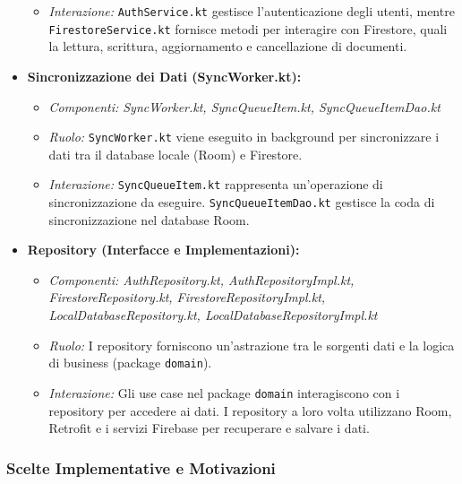 \documentclass{article}
\begin{document}
\begin{itemize}
\begin{itemize}
        \item \textit{Interazione:} \texttt{AuthService.kt} gestisce l'autenticazione degli utenti, mentre \texttt{FirestoreService.kt} fornisce metodi per interagire con Firestore, quali la lettura, scrittura, aggiornamento e cancellazione di documenti.
    \end{itemize}
    \item \textbf{Sincronizzazione dei Dati (SyncWorker.kt):}
    \begin{itemize}
        \item \textit{Componenti: SyncWorker.kt, SyncQueueItem.kt, SyncQueueItemDao.kt}
        \item \textit{Ruolo:} \texttt{SyncWorker.kt} viene eseguito in background per sincronizzare i dati tra il database locale (Room) e Firestore.
        \item \textit{Interazione:} \texttt{SyncQueueItem.kt} rappresenta un'operazione di sincronizzazione da eseguire. \texttt{SyncQueueItemDao.kt} gestisce la coda di sincronizzazione nel database Room.
    \end{itemize}
    \item \textbf{Repository (Interfacce e Implementazioni):}
    \begin{itemize}
        \item \textit{Componenti: AuthRepository.kt, AuthRepositoryImpl.kt, FirestoreRepository.kt, FirestoreRepositoryImpl.kt, LocalDatabaseRepository.kt, LocalDatabaseRepositoryImpl.kt}
        \item \textit{Ruolo:} I repository forniscono un'astrazione tra le sorgenti dati e la logica di business (package \texttt{domain}).
        \item \textit{Interazione:} Gli use case nel package \texttt{domain} interagiscono con i repository per accedere ai dati. I repository a loro volta utilizzano Room, Retrofit e i servizi Firebase per recuperare e salvare i dati.
    \end{itemize}
\end{itemize}

\subsubsection{Scelte Implementative e Motivazioni}
\end{document}
